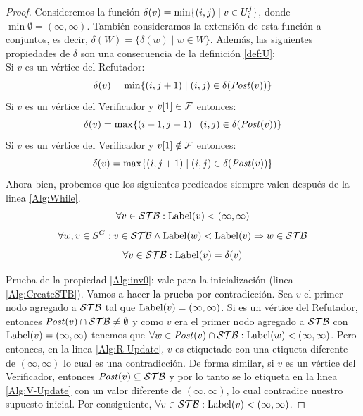 \begin{proof}
Consideremos la función  $\delta(v) = \min \{(i,j) \mid v \in \setsUs\}$, donde $\min \emptyset = (\infty, \infty)$.
También consideramos la extensión de esta función a conjuntos, es decir, $\delta(W) = \{\delta(w) \mid w \in W \}$. 
Además, las siguientes propiedades de $\delta$ son una consecuencia de la definición \ref{def:U}: \\

\noindent
Si $v$ es un vértice del Refutador:
\begin{equation}\label{prop:delta-1}
 \delta(v)  = \min \{(i,j+1) \mid (i,j) \in \delta(\post(v)) \}
\end{equation}
Si $v$ es un vértice del Verificador y $\pr{1}{v} \in \Faults$ entonces:
\begin{equation}\label{prop:delta-2}
 \delta(v)  = \max \{(i+1,j+1) \mid (i,j) \in \delta(\post(v)) \}
\end{equation}
Si $v$ es un vértice del Verificador y $\pr{1}{v} \notin \Faults$ entonces:
\begin{equation}\label{prop:delta-3}
 \delta(v) = \max \{(i,j+1) \mid (i,j) \in \delta(\post(v)) \}
\end{equation}
	Ahora bien, probemos que los siguientes predicados siempre valen después de la linea \ref{Alg:While}.
\begin{equation}\label{Alg:inv0}
	\forall v \in \STB : \Label(v) < (\infty, \infty)
\end{equation}
\begin{equation}\label{Alg:inv1}
	\forall w, v \in S^G : v \in \STB \wedge \Label(w) < \Label(v) \Rightarrow w \in \STB
\end{equation}
\begin{equation}\label{Alg:inv2}
	\forall v \in \STB : \Label(v) = \delta(v)
\end{equation}

Prueba de la propiedad \ref{Alg:inv0}: vale para la inicialización (linea \ref{Alg:CreateSTB}). Vamos a hacer la prueba por contradicción. 
Sea $v$ el primer nodo agregado a $\STB$ tal que $\Label(v) = (\infty, \infty)$.
Si es un vértice del Refutador, entonces $\post(v) \cap \STB \neq \emptyset$ y como $v$ era el primer nodo agregado a $\STB$ con 
$\Label(v) = (\infty, \infty)$ tenemos que $\forall w \in \post(v) \cap \STB: \Label(w) < (\infty, \infty)$. Pero entonces, en la linea \ref{Alg:R-Update},
$v$ es etiquetado con una etiqueta diferente de $(\infty, \infty)$ lo cual es una contradicción. 
De forma similar, si $v$ es un vértice del Verificador, entonces $\post(v) \subseteq \STB$ y 
por lo tanto se lo etiqueta en la linea \ref{Alg:V-Update} con un valor diferente de $(\infty, \infty)$, lo cual contradice nuestro supuesto inicial. 
Por consiguiente, $\forall v \in \STB : \Label(v) < (\infty, \infty)$.


\end{proof}
